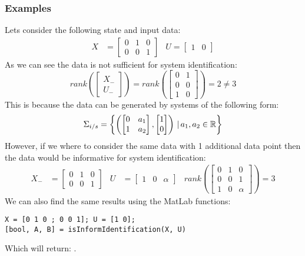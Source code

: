 \subsubsection{Examples}
Lets consider the following state and input data:
\begin{align*}
	X &= \begin{bmatrix} 0&1&0 \\ 0&0&1 \end{bmatrix} & U = \begin{bmatrix}	1&0	\end{bmatrix}
\end{align*} 
As we can see the data is not sufficient for system identification:
\begin{equation*}
	rank\left( \begin{bmatrix} X_{-} \\ U_{-} \end{bmatrix} \right) = rank\left( \begin{bmatrix} 0&1 \\ 0&0 \\ 1&0 \end{bmatrix} \right) = 2 \neq 3
\end{equation*}
This is because the data can be generated by systems of the following form:
\[ \Sigma_{i/s} = \left\{ \left( \begin{bmatrix} 0&a_1 \\ 1&a_2 \end{bmatrix}, \begin{bmatrix} 1 \\ 0 \end{bmatrix} \right) \, | \, a_1, a_2 \in \mathbb{R} \right\} \]
However, if we where to consider the same data with 1 additional data point then the data would be informative for system identification:
\begin{align*}
	X_- &= \begin{bmatrix} 0&1&0 \\ 0&0&1 \end{bmatrix} & U &= \begin{bmatrix}	1&0&\alpha	\end{bmatrix} & rank\left( \begin{bmatrix} 0&1&0 \\ 0&0&1 \\ 1&0&\alpha \end{bmatrix} \right) =  3
\end{align*} 
We can also find the same results using the MatLab functions:
\begin{lstlisting}
X = [0 1 0 ; 0 0 1]; U = [1 0];
[bool, A, B] = isInformIdentification(X, U)
\end{lstlisting}
Which will return: \mon{[ false, [], [] ]}.




